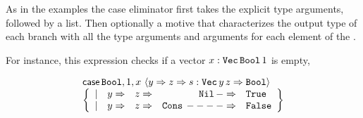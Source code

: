 



As in the examples the case eliminator first takes the explicit type arguments, followed by a \scrut{} list. %
Then optionally a motive that characterizes the output type of each branch with all the type arguments and arguments for each element of the \scruts{}. %

For instance, this \case{} expression checks if a vector $x:\mathtt{Vec}{}\,\mathtt{Bool}{}\,1$ is empty,

\[
  \begin{array}{l}
 \mathsf{case}\,\mathtt{Bool}{},1,x\,\left\langle y\Rightarrow z\Rightarrow s:\mathtt{Vec}{}\,y\,z\Rightarrow\mathtt{Bool}{}\right\rangle \\
 \left\{ 
    \begin{array}{rrrrl}
    |&y\Rightarrow& z\Rightarrow& \mathtt{Nil}{}\,-\Rightarrow& \mathtt{True}{} \\
    |&y\Rightarrow& z\Rightarrow& \mathtt{Cons}{}\,----\Rightarrow& \mathtt{False}{}
    \end{array}
    \right\} 
\end{array}
\]

